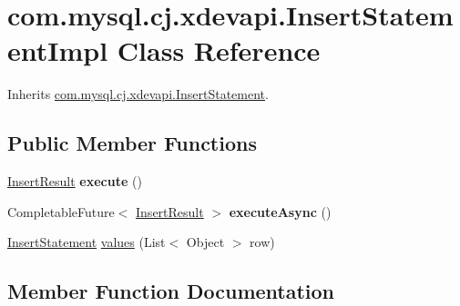 \hypertarget{classcom_1_1mysql_1_1cj_1_1xdevapi_1_1_insert_statement_impl}{}\section{com.\+mysql.\+cj.\+xdevapi.\+Insert\+Statement\+Impl Class Reference}
\label{classcom_1_1mysql_1_1cj_1_1xdevapi_1_1_insert_statement_impl}


Inherits \mbox{\hyperlink{interfacecom_1_1mysql_1_1cj_1_1xdevapi_1_1_insert_statement}{com.\+mysql.\+cj.\+xdevapi.\+Insert\+Statement}}.

\subsection*{Public Member Functions}
\begin{DoxyCompactItemize}
\item 
\mbox{\label{classcom_1_1mysql_1_1cj_1_1xdevapi_1_1_insert_statement_impl_ae56a1e4524afbd143bd7b172da5a958d}} 
\mbox{\hyperlink{interfacecom_1_1mysql_1_1cj_1_1xdevapi_1_1_insert_result}{Insert\+Result}} {\bfseries execute} ()
\item 
\mbox{\label{classcom_1_1mysql_1_1cj_1_1xdevapi_1_1_insert_statement_impl_a4785f26555304b8f166252956daebda1}} 
Completable\+Future$<$ \mbox{\hyperlink{interfacecom_1_1mysql_1_1cj_1_1xdevapi_1_1_insert_result}{Insert\+Result}} $>$ {\bfseries execute\+Async} ()
\item 
\mbox{\hyperlink{interfacecom_1_1mysql_1_1cj_1_1xdevapi_1_1_insert_statement}{Insert\+Statement}} \mbox{\hyperlink{classcom_1_1mysql_1_1cj_1_1xdevapi_1_1_insert_statement_impl_a22848b1b53273551d2c4ce65e2c237de}{values}} (List$<$ Object $>$ row)
\end{DoxyCompactItemize}


\subsection{Member Function Documentation}
\mbox{\label{classcom_1_1mysql_1_1cj_1_1xdevapi_1_1_insert_statement_impl_a22848b1b53273551d2c4ce65e2c237de}} 
